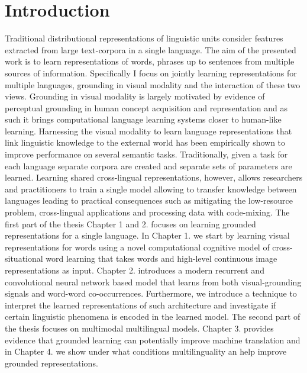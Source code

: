 

\chapter{Introduction}
\label{introduction}

Traditional distributional representations of linguistic units consider features extracted from large text-corpora in a single language.
The aim of the presented work is to learn representations of words, phrases up to sentences from multiple sources of information.
Specifically I focus on jointly learning representations for multiple languages, grounding in visual modality and the interaction of these
two views. Grounding in visual modality is largely motivated by evidence of perceptual grounding in human concept acquisition and
representation \cite{barsalou2003grounding} and as such it brings computational language learning systems closer to human-like
learning. Harnessing the visual modality to learn language representations that link linguistic knowledge
to the external world \cite{kiela2014improving,baroni2016grounding,elliott2017imagination,kiela2017learning,yoo2017improving}  has been empirically shown to
improve performance on several semantic tasks.
Traditionally, given a task for each language separate corpora are created and separate sets of parameters are learned.
Learning shared cross-lingual representations, however, allows researchers and practitioners
to train a single model allowing to transfer knowledge between languages leading to practical consequences such as mitigating the low-resource problem, cross-lingual
applications and processing data with code-mixing.
The first part of the thesis Chapter 1 and 2. focuses on learning grounded representations for a single language.
In Chapter 1. we start by learning visual representations for words  using a novel computational cognitive model of cross-situational word learning that takes words
and high-level continuous image representations as input. Chapter 2. introduces a modern recurrent and convolutional neural network based model that learns from both
visual-grounding signals and word-word co-occurrences. Furthermore, we introduce a technique to interpret the learned representations of such architecture and investigate
if certain linguistic phenomena is encoded in the learned model. The second part of the thesis focuses on multimodal multilingual models. Chapter 3. provides evidence
that grounded learning can potentially improve machine translation and  in Chapter 4. we show under what conditions multilinguality an help improve grounded representations.

